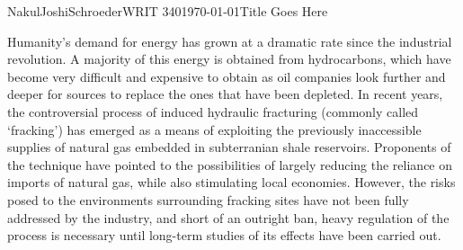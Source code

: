 \documentclass[12pt,letterpaper]{article}
\begin{document}
\begin{mla}{Nakul}{Joshi}{Schroeder}{WRIT 340}{\today}{Title Goes Here}

Humanity's demand for energy has grown at a dramatic rate since the industrial revolution. A majority of this energy is obtained from hydrocarbons, which have become very difficult and expensive to obtain as oil companies look further and deeper for sources to replace the ones that have been depleted. In recent years, the controversial process of induced hydraulic fracturing (commonly called `fracking') has emerged as a means of exploiting the previously inaccessible supplies of natural gas embedded in subterranian shale reservoirs. Proponents of the technique have pointed to the possibilities of largely reducing the reliance on imports of natural gas, while also stimulating local economies. However, the risks posed to the environments surrounding fracking sites have not been fully addressed by the industry, and short of an outright ban, heavy regulation of the process is necessary until long-term studies of its effects have been carried out.
\end{mla}
\end{document}

